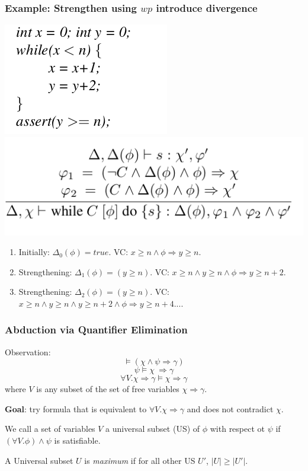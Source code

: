 \documentclass[11pt]{beamer}
\begin{document}
\begin{frame}\frametitle{Example: Strengthen using $wp$ introduce divergence}
\begin{multicols}{2}

\begin{center}
\includegraphics[scale=0.3]{diverge.png}
\includegraphics[scale=0.3]{loop.png}
\end{center}

\begin{enumerate}
\item Initially: $\Delta_0(\phi) = true$. VC: $x \ge n \wedge \phi \Rightarrow y\ge n$.
\item Strengthening: $\Delta_1(\phi) = (y \ge n)$. VC: $x \ge n \wedge y\ge n \wedge \phi \Rightarrow y \ge n+2$.

\item Strengthening: $\Delta_2(\phi) = (y \ge n)$. VC: $x \ge n \wedge y\ge n \wedge y \ge n+2 \wedge \phi \Rightarrow y \ge n + 4 $....

\end{enumerate}

\end{multicols}
\end{frame}

\begin{frame}\frametitle{Abduction via Quantifier Elimination}

Observation: 
\[\models (\chi\wedge \psi \Rightarrow \gamma)\]
\[\psi \models \chi\ \Rightarrow \gamma\]
\[\forall V. \chi\Rightarrow \gamma \models \chi \Rightarrow \gamma\]
where $V$ is any subset of the set of free variables $\chi\Rightarrow \gamma$.

\textbf{Goal}: try formula that is equivalent to $\forall V. \chi\Rightarrow \gamma $ and does not contradict $\chi$.

\begin{definition}
We call a set of variables $V$ a universal subset (US) of $\phi$ with respect ot $\psi$ if $(\forall V. \phi)\wedge \psi$ is satisfiable.
\end{definition}
A Universal subset $U$ is \emph{maximum} if for all other US $U'$, $|U| \ge |U'|$.
\end{frame}
\end{document}
